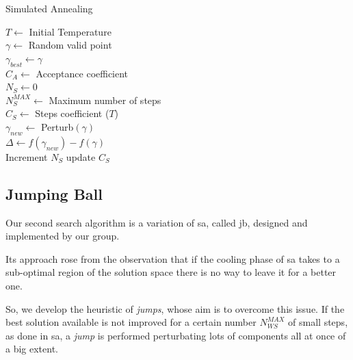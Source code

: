 \documentclass[12pt,journal,draftclsnofoot,onecolumn]{IEEEtran}
\begin{document}
\begin{algorithm}
\caption{Simulated Annealing} \label{algo:SA}
$T \gets$ Initial Temperature \\
$\gamma \gets$ Random valid point \\
$\gamma_{best} \gets \gamma$ \\
$C_A \gets$ Acceptance coefficient \\
$N_S \gets 0$ \\
$N_S^{MAX} \gets $ Maximum number of steps \\

 {
	$C_S \gets$ Steps coefficient ($T$) \\
	 {
		\vspace{1mm}
		$\gamma_{new} \gets$ Perturb$(\gamma)$\\
		$\Delta \gets f(\gamma_{new})-f(\gamma)$ \\
		Increment $N_S$
		update $C_S$\\
	}
}
\end{algorithm}

\clearpage
\subsection{Jumping Ball}

Our second search algorithm is a variation of \gls{sa}, called \gls{jb}, designed and implemented by our group.

Its approach rose from the observation that if the cooling phase of \gls{sa} takes to a sub-optimal region of the solution space there is no way to leave it for a better one.

So, we develop the heuristic of \emph{jumps}, whose aim is to overcome this issue. If the best solution available is not improved for a certain number $N_{WS}^{MAX}$ of small steps, as done in \gls{sa}, a \emph{jump} is performed perturbating lots of components all at once of a big extent.
\end{document}
